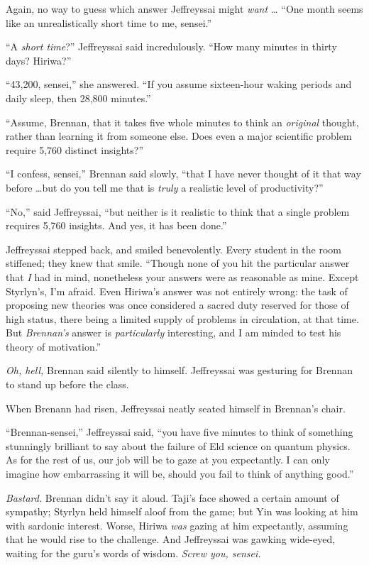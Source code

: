{
 Again, no way to guess which answer Jeffreyssai might \textit{want
\ldots} ``One month seems like an unrealistically short
time to me, sensei.''}

{
 ``A \textit{short time}?''
Jeffreyssai said incredulously. ``How many minutes in
thirty days? Hiriwa?''}

{
 ``43,200, sensei,'' she
answered. ``If you assume sixteen-hour waking periods
and daily sleep, then 28,800 minutes.''}

{
 ``Assume, Brennan, that it takes five whole
minutes to think an \textit{original} thought, rather than learning it
from someone else. Does even a major scientific problem require 5,760
distinct insights?''}

{
 ``I confess, sensei,'' Brennan
said slowly, ``that I have never thought of it that
way before \ldots but do you tell me that is \textit{truly} a realistic
level of productivity?''}

{
 ``No,'' said Jeffreyssai,
``but neither is it realistic to think that a single
problem requires 5,760 insights. And yes, it has been
done.''}

{
 Jeffreyssai stepped back, and smiled benevolently. Every student
in the room stiffened; they knew that smile. ``Though
none of you hit the particular answer that \textit{I} had in mind,
nonetheless your answers were as reasonable as mine. Except
Styrlyn's, I'm afraid. Even
Hiriwa's answer was not entirely wrong: the task of
proposing new theories was once considered a sacred duty reserved for
those of high status, there being a limited supply of problems in
circulation, at that time. But \textit{Brennan's}
answer is \textit{particularly} interesting, and I am minded to test
his theory of motivation.''}

{
 \textit{Oh, hell,} Brennan said silently to himself. Jeffreyssai
was gesturing for Brennan to stand up before the class.}

{
 When Brenann had risen, Jeffreyssai neatly seated himself in
Brennan's chair.}

{
 ``Brennan-sensei,'' Jeffreyssai
said, ``you have five minutes to think of something
stunningly brilliant to say about the failure of Eld science on quantum
physics. As for the rest of us, our job will be to gaze at you
expectantly. I can only imagine how embarrassing it will be, should you
fail to think of anything good.''}

{
 \textit{Bastard.} Brennan didn't say it aloud.
Taji's face showed a certain amount of sympathy;
Styrlyn held himself aloof from the game; but Yin was looking at him
with sardonic interest. Worse, Hiriwa \textit{was} gazing at him
expectantly, assuming that he would rise to the challenge. And
Jeffreyssai was gawking wide-eyed, waiting for the
guru's words of wisdom. \textit{Screw you, sensei.}}


